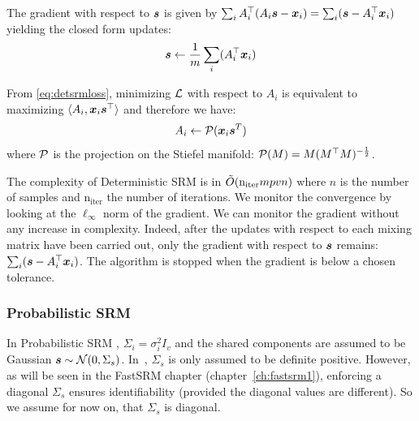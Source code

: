 The gradient with respect to $\boldsymbol{s}$ is given by $ \sum_i A_i^{\top}(A_i \boldsymbol{s} -
\boldsymbol{x}_i) = \sum_i (\boldsymbol{s} -
A_i^{\top} \boldsymbol{x}_i)$
yielding the closed form updates:
\begin{equation}
  \boldsymbol{s} \leftarrow  \frac1m \sum_i (A_i^{\top} \boldsymbol{x}_i)
  \label{eq:srm:supdate}
\end{equation}

From \eqref{eq:detsrmloss}, minimizing $\mathcal{L}$ with respect to $A_i$ is
equivalent to maximizing $\langle{ A_i},{ \boldsymbol{x}_i \boldsymbol{s}^{\top} }\rangle$ and therefore we
have:
\begin{equation}
  A_i \leftarrow  \mathcal{P}(\boldsymbol{x}_i \boldsymbol{s}^T)
  \label{eq:detsrm:Aiupdate}
\end{equation}
where $\mathcal{P}$ is the projection on the Stiefel manifold: $\mathcal{P}(M) = M
(M^{\top}M)^{-\frac12}$.

The complexity of Deterministic SRM is in $\tilde{O}(\mathrm{n_{iter}} mpvn)$ where
$n$ is the number of samples and $\mathrm{n_{iter}}$ the number of iterations.
We monitor the convergence by looking at the $\ell_{\infty}$ norm of the
gradient. We can monitor the gradient without any increase in complexity.
Indeed, after the updates with respect to each mixing matrix have been
carried out, only the gradient with respect to $\boldsymbol{s}$ remains: $\sum_i
(\boldsymbol{s} - A_i^{\top}\boldsymbol{x}_i)$. The algorithm is stopped when the
gradient is below a chosen tolerance.

\subsubsection{Probabilistic SRM}
\label{sec:probabilisticsrm}
In Probabilistic SRM , $\Sigma_i=\sigma_i^2 I_v$ and the shared
components are assumed to be Gaussian $\boldsymbol{s} \sim \mathcal{N}(0, \Sigma_s)$.
In~\cite{chen2015reduced}, $\Sigma_s$ is only assumed to be definite positive. However,
as will be seen in the FastSRM chapter (chapter~\ref{ch:fastsrm1}), enforcing a diagonal $\Sigma_s$ ensures
identifiability (provided the diagonal values are different). So we assume for
now on, that $\Sigma_s$ is diagonal.

